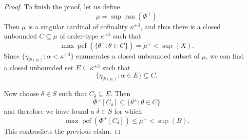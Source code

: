 \documentclass[10pt]{amsart}
\theoremstyle{plain}
\theoremstyle{definition}
\theoremstyle{remark}
\DeclareMathOperator{\ran}{ran}
\DeclareMathOperator{\pcf}{pcf}
\numberwithin{equation}{section}
\begin{document}
\begin{proof}
To finish the proof,  let us define
\begin{equation}
\mu = \sup\ran(\Phi^+)
\end{equation}
Then $\mu$ is a singular cardinal of cofinality $\kappa^{+3}$, and thus there is a closed unbounded $C\subseteq\mu$ of order-type
$\kappa^{+3}$ such that
\begin{equation}
\max\pcf(\{\theta^+:\theta\in C\})=\mu^+<\sup(X).
\end{equation}
Since $\{\eta_{\Phi(\alpha)}:\alpha<\kappa^{+3}\}$ enumerates a closed unbounded subset of $\mu$, we can find a closed unbounded
set $E\subseteq\kappa^{+3}$ such that
\begin{equation}
\{\eta_{\Phi(\alpha)}:\alpha\in E\}\subseteq C.
\end{equation}


Now choose $\delta\in S$ such that $C_\delta\subseteq E$.  Then
\begin{equation}
\Phi^+[C_\delta]\subseteq\{\theta^+:\theta\in C\}
\end{equation}
and therefore we have found a $\delta\in S$ for which
\begin{equation}
\max\pcf\left(\Phi^+[C_\delta]\right)\leq\mu^+<\sup(B).
\end{equation}
This contradicts the previous claim.
\end{proof}
\end{document}
